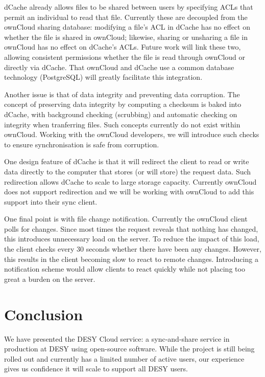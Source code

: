 \documentclass[a4paper]{jpconf}
\begin{document}
dCache already allows files to be shared between users by specifying
ACLs that permit an individual to read that file.  Currently these are
decoupled from the ownCloud sharing database: modifying a file's ACL
in dCache has no effect on whether the file is shared in ownCloud;
likewise, sharing or unsharing a file in ownCloud has no effect on
dCache's ACLs.  Future work will link these two, allowing consistent
permissions whether the file is read through ownCloud or directly via
dCache.  That ownCloud and dCache use a common database technology
(PostgreSQL) will greatly facilitate this integration.

Another issue is that of data integrity and preventing data
corruption.  The concept of preserving data integrity by computing a
checksum is baked into dCache, with background checking (scrubbing)
and automatic checking on integrity when tranferring files.  Such
concepts currently do not exist within ownCloud.  Working with the
ownCloud developers, we will introduce such checks to ensure
synchronisation is safe from corruption.

One design feature of dCache is that it will redirect the client to
read or write data directly to the computer that stores (or will
store) the request data.  Such redirection allows dCache to scale to
large storage capacity.  Currently ownCloud does not support
redirection and we will be working with ownCloud to add this support
into their sync client.

One final point is with file change notification.  Currently the
ownCloud client polls for changes.  Since most times the request
reveals that nothing has changed, this introduces unnecessary load on
the server.  To reduce the impact of this load, the client checks
every 30 seconds whether there have been any changes.  However, this
results in the client becoming slow to react to remote changes.
Introducing a notification scheme would allow clients to react quickly
while not placing too great a burden on the server.

\section{Conclusion}

We have presented the DESY Cloud service: a sync-and-share service in
production at DESY using open-source software.  While the project is
still being rolled out and currently has a limited number of active
users, our experience gives us confidence it will scale to support all
DESY users.
\end{document}
